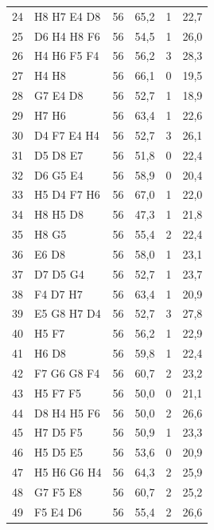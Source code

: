 {\begin{longtable}{rlrrrr}
    24 & H8 H7 E4 D8 & 56 & 65,2 & 1 & 22,7 \\
    25 & D6 H4 H8 F6 & 56 & 54,5 & 1 & 26,0 \\
    26 & H4 H6 F5 F4 & 56 & 56,2 & 3 & 28,3 \\
    27 & H4 H8 & 56 & 66,1 & 0 & 19,5 \\
    28 & G7 E4 D8 & 56 & 52,7 & 1 & 18,9 \\
    29 & H7 H6 & 56 & 63,4 & 1 & 22,6 \\
    30 & D4 F7 E4 H4 & 56 & 52,7 & 3 & 26,1 \\
    31 & D5 D8 E7 & 56 & 51,8 & 0 & 22,4 \\
    32 & D6 G5 E4 & 56 & 58,9 & 0 & 20,4 \\
    33 & H5 D4 F7 H6 & 56 & 67,0 & 1 & 22,0 \\
    34 & H8 H5 D8 & 56 & 47,3 & 1 & 21,8 \\
    35 & H8 G5 & 56 & 55,4 & 2 & 22,4 \\
    36 & E6 D8 & 56 & 58,0 & 1 & 23,1 \\
    37 & D7 D5 G4 & 56 & 52,7 & 1 & 23,7 \\
    38 & F4 D7 H7 & 56 & 63,4 & 1 & 20,9 \\
    39 & E5 G8 H7 D4 & 56 & 52,7 & 3 & 27,8 \\
    40 & H5 F7 & 56 & 56,2 & 1 & 22,9 \\
    41 & H6 D8 & 56 & 59,8 & 1 & 22,4 \\
    42 & F7 G6 G8 F4 & 56 & 60,7 & 2 & 23,2 \\
    43 & H5 F7 F5 & 56 & 50,0 & 0 & 21,1 \\
    44 & D8 H4 H5 F6 & 56 & 50,0 & 2 & 26,6 \\
    45 & H7 D5 F5 & 56 & 50,9 & 1 & 23,3 \\
    46 & H5 D5 E5 & 56 & 53,6 & 0 & 20,9 \\
    47 & H5 H6 G6 H4 & 56 & 64,3 & 2 & 25,9 \\
    48 & G7 F5 E8 & 56 & 60,7 & 2 & 25,2 \\
    49 & F5 E4 D6 & 56 & 55,4 & 2 & 26,6 \\
\end{longtable}
}
